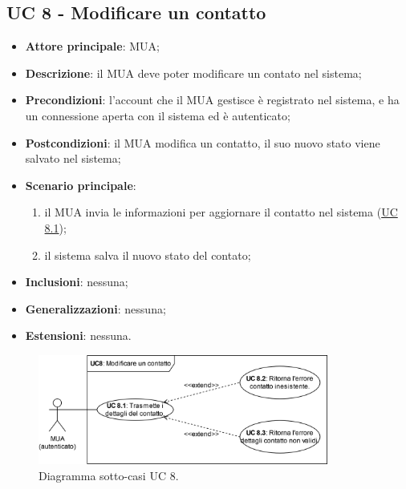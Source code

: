 \subsection{UC 8 - Modificare un contatto} \label{sec:UC8}
    \begin{itemize}
        \item \textbf{Attore principale}: MUA;
        \item \textbf{Descrizione}: il MUA deve poter modificare un contato nel sistema;
        \item \textbf{Precondizioni}: l’account che il MUA gestisce è registrato nel sistema, e ha un connessione aperta con il sistema ed è autenticato;
        \item \textbf{Postcondizioni}: il MUA modifica un contatto, il suo nuovo stato viene salvato nel sistema;
        \item \textbf{Scenario principale}:
            \begin{enumerate}
                \item il MUA invia le informazioni per aggiornare il contatto nel sistema (\hyperref[sec:UC8.1]{UC 8.1});
                \item il sistema salva il nuovo stato del contato;
            \end{enumerate}
        \item \textbf{Inclusioni}: nessuna;
        \item \textbf{Generalizzazioni}: nessuna;
        \item \textbf{Estensioni}: nessuna.
    \end{itemize}

\begin{figure}[h]
    \includegraphics[width=0.85\textwidth]{sections/uc_imgs/UC08.X.png}
    \centering
    \caption{Diagramma sotto-casi UC 8.}
\end{figure}


